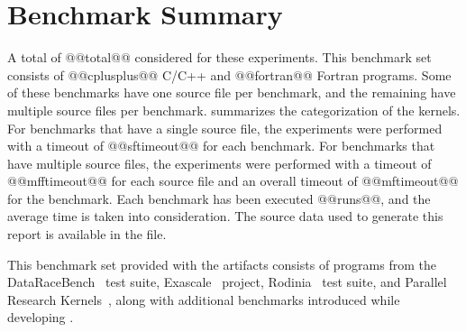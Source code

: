 \section{Benchmark Summary}
A total of @@total@@ considered for these experiments. This benchmark set consists of @@cplusplus@@ C/C++ and @@fortran@@ Fortran programs. Some of these benchmarks have one source file per benchmark, and the remaining have multiple source files per benchmark.  summarizes the categorization of the kernels. For benchmarks that have a single source file, the experiments were performed with a timeout of @@sftimeout@@ for each benchmark. For benchmarks that have multiple source files, the experiments were performed with a timeout of @@mfftimeout@@ for each source file and an overall timeout of @@mftimeout@@ for the benchmark. Each benchmark has been executed @@runs@@, and the average time is taken into consideration. The source data used to generate this report is available in the  file.

This benchmark set provided with the artifacts consists of programs from the DataRaceBench~\cite{liao2017dataracebench} test suite, Exascale~\cite{exascale} project, Rodinia~\cite{che2009rodinia} test suite, and Parallel Research Kernels~\cite{parres}, along with additional benchmarks introduced while developing \tool.


